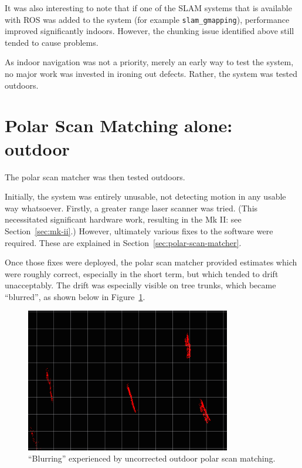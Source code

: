 \documentclass[12pt,oneside,a4paper]{book}
\begin{document}
It was also interesting to note that if one of the SLAM systems that
is available with ROS was added to the system (for example
\texttt{slam\_gmapping}), performance improved significantly
indoors. However, the chunking issue identified above still tended to
cause problems.

As indoor navigation was not a priority, merely an early way to test
the system, no major work was invested in ironing out defects. Rather,
the system was tested outdoors.

\section{Polar Scan Matching alone: outdoor}
\label{sec:psm-outdoor}

The polar scan matcher was then tested outdoors.

Initially, the system was entirely unusable, not detecting motion in
any usable way whatsoever. Firstly, a greater range laser scanner was
tried. (This necessitated significant hardware work, resulting in the
Mk II: see Section~\ref{sec:mk-ii}.) However, ultimately various fixes
to the software were required. These are explained in
Section~\ref{sec:polar-scan-matcher}.

Once those fixes were deployed, the polar scan matcher provided
estimates which were roughly correct, especially in the short term,
but which tended to drift unacceptably. The drift was especially
visible on tree trunks, which became ``blurred'', as shown below in
Figure~\ref{fig:blur-detailed}. 

\begin{figure}[h!]
  \centering
  \includegraphics[width=0.8\textwidth]{figs/blurring}
  \caption{``Blurring'' experienced by uncorrected outdoor polar scan matching.}
  \label{fig:blur-detailed}
\end{figure}
\end{document}
